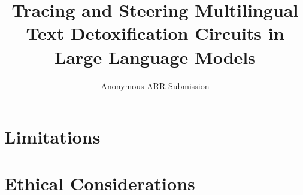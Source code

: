 \documentclass[11pt]{article}
\title{Tracing and Steering Multilingual Text Detoxification Circuits in Large Language Models}
\author{Anonymous ARR Submission}
\begin{document}
\maketitle











\section*{Limitations}


\section*{Ethical Considerations}




\appendix

\end{document}
